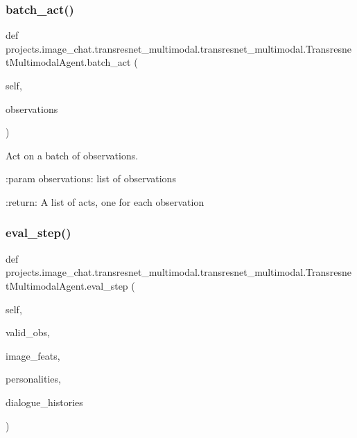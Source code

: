 \subsubsection{\texorpdfstring{batch\+\_\+act()}{batch\_act()}}
{\footnotesize\ttfamily def projects.\+image\+\_\+chat.\+transresnet\+\_\+multimodal.\+transresnet\+\_\+multimodal.\+Transresnet\+Multimodal\+Agent.\+batch\+\_\+act (\begin{DoxyParamCaption}\item[{}]{self,  }\item[{}]{observations }\end{DoxyParamCaption})}

\begin{DoxyVerb}Act on a batch of observations.

:param observations:
    list of observations

:return:
    A list of acts, one for each observation
\end{DoxyVerb}
 \mbox{\label{classprojects_1_1image__chat_1_1transresnet__multimodal_1_1transresnet__multimodal_1_1TransresnetMultimodalAgent_a8f934968183ae14794bcec65abaef624}} 
\subsubsection{\texorpdfstring{eval\+\_\+step()}{eval\_step()}}
{\footnotesize\ttfamily def projects.\+image\+\_\+chat.\+transresnet\+\_\+multimodal.\+transresnet\+\_\+multimodal.\+Transresnet\+Multimodal\+Agent.\+eval\+\_\+step (\begin{DoxyParamCaption}\item[{}]{self,  }\item[{}]{valid\+\_\+obs,  }\item[{}]{image\+\_\+feats,  }\item[{}]{personalities,  }\item[{}]{dialogue\+\_\+histories }\end{DoxyParamCaption})}

